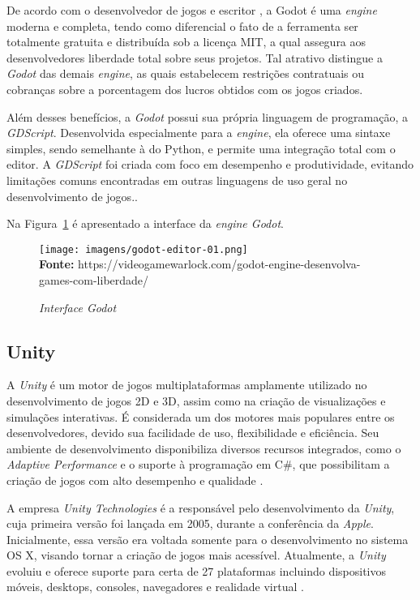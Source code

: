 De acordo com o desenvolvedor de jogos e escritor , a Godot é uma \textit{engine} moderna e completa, tendo como diferencial o fato de a ferramenta ser totalmente gratuita e distribuída sob a licença MIT, a qual assegura aos desenvolvedores liberdade total sobre seus projetos. Tal atrativo distingue a \textit{Godot} das demais \textit{engine}, as quais estabelecem restrições contratuais ou cobranças sobre a porcentagem dos lucros obtidos com os jogos criados.


Além desses benefícios, a \textit{Godot} possui sua própria linguagem de programação, a  \textit{GDScript}. Desenvolvida especialmente para a \textit{engine}, ela oferece uma sintaxe simples, sendo semelhante à do Python, e permite uma integração total com o editor. A \textit{GDScript} foi criada com foco em desempenho e produtividade, evitando limitações comuns encontradas em outras linguagens de uso geral no desenvolvimento de jogos.\cite{GodotDocs2024}.

Na Figura~\ref{fig:godot} é apresentado a interface da \textit{engine Godot}.

\FloatBarrier 
\begin{figure}[!htbp]
	\centering
	\caption{\textit{Interface Godot}}
	\texttt{[image: imagens/godot-editor-01.png]}
	\\\textbf{Fonte:} https://videogamewarlock.com/godot-engine-desenvolva-games-com-liberdade/
	
	\label{fig:godot}
\end{figure}
\FloatBarrier


\subsection{Unity}

A \textit{Unity} é um motor de jogos multiplataformas amplamente utilizado no desenvolvimento de jogos 2D e 3D, assim como na criação de visualizações e simulações interativas. É considerada um dos motores mais populares entre os desenvolvedores, devido sua facilidade de uso, flexibilidade e eficiência. Seu ambiente de desenvolvimento disponibiliza diversos recursos integrados, como o \textit{Adaptive Performance} e o suporte à programação em C\#, que possibilitam a criação de jogos com alto desempenho e qualidade \cite{Hussain2020}.

A empresa \textit{Unity Technologies } é a responsável pelo desenvolvimento da \textit{Unity}, cuja primeira versão foi lançada em 2005, durante a conferência da \textit{Apple}. Inicialmente, essa versão era voltada somente para o desenvolvimento no sistema OS X, visando tornar a criação de jogos mais acessível. Atualmente, a \textit{Unity} evoluiu e oferece suporte para certa de 27 plataformas  incluindo dispositivos móveis, desktops, consoles, navegadores e realidade virtual \cite{Smid2017}.

